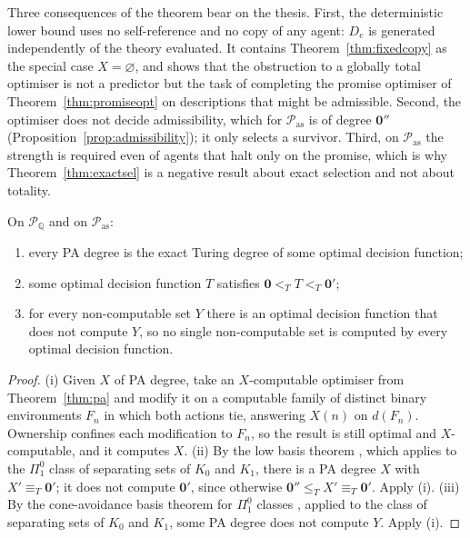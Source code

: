 Three consequences of the theorem bear on the thesis. First, the deterministic lower bound uses no
self-reference and no copy of any agent: $D_e$ is generated independently of the theory evaluated.
It contains Theorem~\ref{thm:fixedcopy} as the special case $X=\varnothing$, and shows that the
obstruction to a globally total optimiser is not a predictor but the task of completing the promise
optimiser of Theorem~\ref{thm:promiseopt} on descriptions that might be admissible. Second, the
optimiser does not decide admissibility, which for $\mathcal P_{\mathrm{as}}$ is of degree
$\mathbf 0''$ (Proposition~\ref{prop:admissibility}); it only selects a survivor. Third, on
$\mathcal P_{\mathrm{as}}$ the strength is required even of agents that halt only on the promise,
which is why Theorem~\ref{thm:exactsel} is a negative result about exact selection and not about
totality.

\begin{corollary}\label{cor:spectrum}
On $\mathcal P_{\mathbb Q}$ and on $\mathcal P_{\mathrm{as}}$:
\begin{enumerate}[label=(\roman*)]
  \item every PA degree is the exact Turing degree of some optimal decision function;
  \item some optimal decision function $T$ satisfies $\mathbf 0<_T T<_T\mathbf 0'$;
  \item for every non-computable set $Y$ there is an optimal decision function that does not compute
        $Y$, so no single non-computable set is computed by every optimal decision function.
\end{enumerate}
\end{corollary}

\begin{proof}
(i) Given $X$ of PA degree, take an $X$-computable optimiser from Theorem~\ref{thm:pa} and modify it on
a computable family of distinct binary environments $F_n$ in which both actions tie, answering
$X(n)$ on $d(F_n)$. Ownership confines each modification to $F_n$, so the result is still optimal and
$X$-computable, and it computes $X$. (ii) By the low basis theorem \autocite[Thm.~2.1]{jockuschsoare1972trans}, which applies
to the $\Pi^0_1$ class of separating sets of $K_0$ and $K_1$,
there is a PA degree $X$ with $X'\equiv_T\mathbf 0'$; it does not compute $\mathbf 0'$, since otherwise
$\mathbf 0''\le_T X'\equiv_T\mathbf 0'$. Apply (i). (iii) By the cone-avoidance basis theorem for
$\Pi^0_1$ classes \autocite[Thm.~2.5]{jockuschsoare1972trans}, applied to the class of separating sets of $K_0$
and $K_1$, some PA degree does not compute $Y$. Apply (i).
\end{proof}

